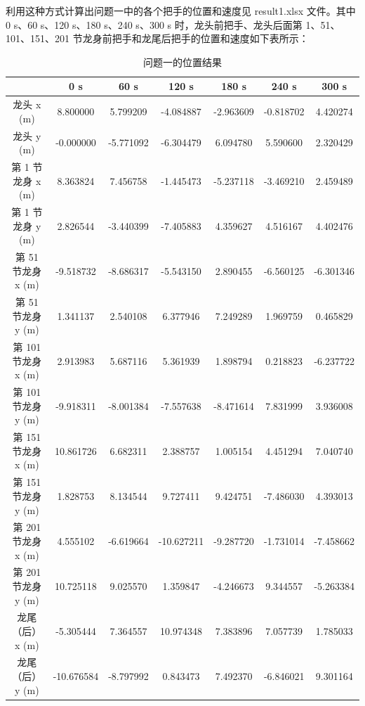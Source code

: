 \documentclass[a4paper]{article}
\begin{document}
		利用这种方式计算出问题一中的各个把手的位置和速度见 result1.xlsx 文件。其中 0 s、60 s、120 s、180 s、240 s、300 s 时，龙头前把手、龙头后面第 1、51、101、151、201 节龙身前把手和龙尾后把手的位置和速度如下表所示：


		\begin{table}[H] %
			\captionsetup{skip=4pt} %
			\caption{问题一的位置结果}
			\centering
			\setlength{\arrayrulewidth}{0.5pt} %
			\begin{tabular}{|c|c|c|c|c|c|c|} %
				\hline
				& 0 s & 60 s & 120 s & 180 s & 240 s & 300 s \\ \hline
				龙头 x (m)         & 8.800000 &	5.799209 &	-4.084887 &	-2.963609 &	-0.818702 &	4.420274 \\ \hline
				龙头 y (m)         & -0.000000 &	-5.771092 &	-6.304479 &	6.094780 &	5.590600 &	2.320429 \\ \hline
				第 1 节龙身 x (m)  & 8.363824 &	7.456758 &	-1.445473 &	-5.237118 &	-3.469210 &	2.459489 \\ \hline
				第 1 节龙身 y (m)  & 2.826544 &	-3.440399 &	-7.405883 &	4.359627 &	4.516167 &	4.402476 \\ \hline
				第 51 节龙身 x (m) & -9.518732 &	-8.686317 &	-5.543150 &	2.890455 &	-6.560125 &	-6.301346 \\ \hline
				第 51 节龙身 y (m) & 1.341137 &	2.540108 &	6.377946 &	7.249289 &	1.969759 &	0.465829 \\ \hline
				第 101 节龙身 x (m) &2.913983 &	5.687116 &	5.361939 &	1.898794 &	0.218823 &	-6.237722 \\ \hline
				第 101 节龙身 y (m) &-9.918311 &	-8.001384 &	-7.557638 &	-8.471614 &	7.831999 &	3.936008 \\ \hline
				第 151 节龙身 x (m) &10.861726 &	6.682311 &	2.388757 &	1.005154 &	4.451294 &	7.040740 \\ \hline
				第 151 节龙身 y (m) &1.828753 &	8.134544 &	9.727411 &	9.424751 &	-7.486030 &	4.393013 \\ \hline
				第 201 节龙身 x (m) &4.555102 &	-6.619664 &	-10.627211 &	-9.287720 &	-1.731014 &	-7.458662 \\ \hline
				第 201 节龙身 y (m) &10.725118 &	9.025570 &	1.359847 &	-4.246673 &	9.344557 &	-5.263384 \\ \hline
				龙尾（后） x (m)    &-5.305444 &	7.364557 &	10.974348 &	7.383896 &	7.057739 &	1.785033 \\ \hline
				龙尾（后） y (m)    &-10.676584 &	-8.797992 &	0.843473 &	7.492370 &	-6.846021 &	9.301164 \\ \hline
			\end{tabular}
		\end{table}
\end{document}
